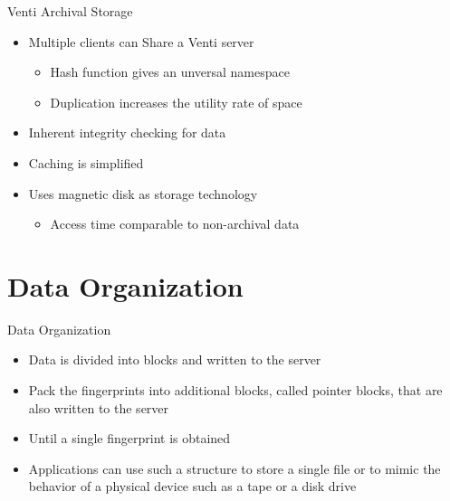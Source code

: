 \begin{frame}{Venti Archival Storage}

\begin{itemize}
\itemsep1pt\parskip0pt
\item
  Multiple clients can Share a Venti server

  \begin{itemize}
  \itemsep1pt\parskip0pt
  \item
    Hash function gives an unversal namespace
  \item
    Duplication increases the utility rate of space
  \end{itemize}
\item
  Inherent integrity checking for data
\item
  Caching is simplified
\item
  Uses magnetic disk as storage technology

  \begin{itemize}
  \itemsep1pt\parskip0pt
  \item
    Access time comparable to non-archival data
  \end{itemize}
\end{itemize}

\end{frame}

\section[Organization]{Data Organization}\label{data-organization}

\begin{frame}{Data Organization}

\begin{itemize}
\itemsep1pt\parskip0pt
\item
  Data is divided into blocks and written to the server
\item
  Pack the fingerprints into additional blocks, called pointer blocks,
  that are also written to the server
\item
  Until a single fingerprint is obtained
\item
  Applications can use such a structure to store a single file or to
  mimic the behavior of a physical device such as a tape or a disk drive
\end{itemize}

\end{frame}

